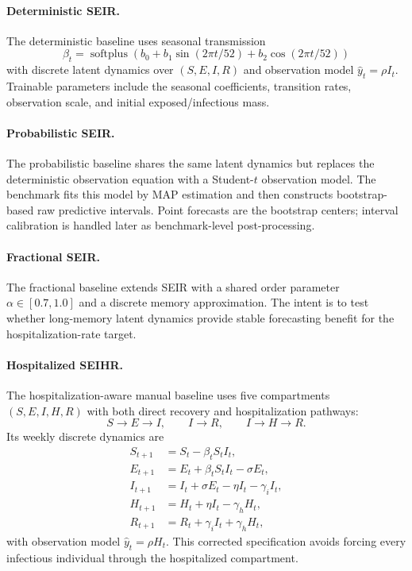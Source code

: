 \paragraph{Deterministic SEIR.}
The deterministic baseline uses seasonal transmission
\[
\beta_t = \operatorname{softplus}\!\left(b_0 +
b_1 \sin(2 \pi t / 52) + b_2 \cos(2 \pi t / 52)\right)
\]
with discrete latent dynamics over $(S,E,I,R)$ and observation model
$\hat{y}_t = \rho I_t$. Trainable parameters include the seasonal coefficients,
transition rates, observation scale, and initial exposed/infectious mass.

\paragraph{Probabilistic SEIR.}
The probabilistic baseline shares the same latent dynamics but replaces the
deterministic observation equation with a Student-$t$ observation model. The
benchmark fits this model by MAP estimation and then constructs bootstrap-based
raw predictive intervals. Point forecasts are the bootstrap centers; interval
calibration is handled later as benchmark-level post-processing.

\paragraph{Fractional SEIR.}
The fractional baseline extends SEIR with a shared order parameter
$\alpha \in [0.7, 1.0]$ and a discrete memory approximation. The intent is to
test whether long-memory latent dynamics provide stable forecasting benefit for
the hospitalization-rate target.

\paragraph{Hospitalized SEIHR.}
The hospitalization-aware manual baseline uses five compartments
$(S,E,I,H,R)$ with both direct recovery and hospitalization pathways:
\[
S \rightarrow E \rightarrow I,\qquad
I \rightarrow R,\qquad
I \rightarrow H \rightarrow R.
\]
Its weekly discrete dynamics are
\begin{align*}
S_{t+1} &= S_t - \beta_t S_t I_t, \\
E_{t+1} &= E_t + \beta_t S_t I_t - \sigma E_t, \\
I_{t+1} &= I_t + \sigma E_t - \eta I_t - \gamma_i I_t, \\
H_{t+1} &= H_t + \eta I_t - \gamma_h H_t, \\
R_{t+1} &= R_t + \gamma_i I_t + \gamma_h H_t,
\end{align*}
with observation model $\hat{y}_t = \rho H_t$. This corrected specification
avoids forcing every infectious individual through the hospitalized compartment.

